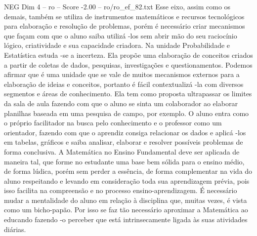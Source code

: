 \begin{textsample}{NEG Dim 4 – ro – Score -2.00 – ro/ro\_ef\_82.txt}
Esse eixo, assim como os demais, também se utiliza de instrumentos matemáticos e recursos tecnológicos para elaboração e resolução de problemas, porém é necessário criar mecanismos que façam com que o aluno saiba utilizá -los sem abrir mão do seu raciocínio lógico, criatividade e sua capacidade criadora.
Na unidade Probabilidade e Estatística estuda -se a incerteza.
Ela propõe uma elaboração de conceitos criados a partir de coletas de dados, pesquisas, investigações e questionamentos.
Podemos afirmar que é uma unidade que se vale de muitos mecanismos externos para a elaboração de ideias e conceitos, portanto é fácil contextualizá -la com diversos segmentos e áreas de conhecimento.
Ela tem como proposta ultrapassar os limites da sala de aula fazendo com que o aluno se sinta um colaborador ao elaborar planilhas baseada em uma pesquisa de campo, por exemplo.
O aluno entra como o próprio facilitador na busca pelo conhecimento e o professor como um orientador, fazendo com que o aprendiz consiga relacionar os dados e aplicá -los em tabelas, gráficos e saiba analisar, elaborar e resolver possíveis problemas de forma conclusiva.
A Matemática no Ensino Fundamental deve ser aplicada de maneira tal, que forme no estudante uma base bem sólida para o ensino médio, de forma lúdica, porém sem perder a essência, de forma complementar na vida do aluno respeitando e levando em consideração toda sua aprendizagem prévia, pois isso facilita na compreensão e no processo ensino-aprendizagem.
É necessário mudar a mentalidade do aluno em relação à disciplina que, muitas vezes, é vista como um bicho-papão.
Por isso se faz tão necessário aproximar a Matemática ao educando fazendo -o perceber que está intrinsecamente ligada às suas atividades diárias.

\end{textsample}
